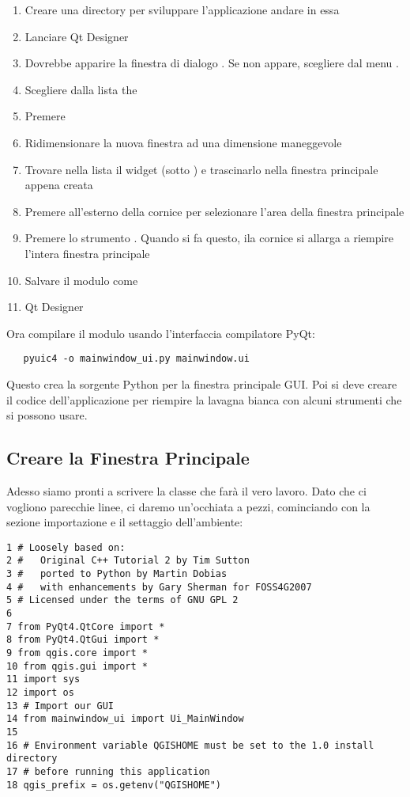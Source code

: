 \begin{enumerate}
\item Creare una directory per sviluppare l'applicazione andare in essa
\item Lanciare Qt Designer
\item Dovrebbe apparire la finestra di dialogo . Se non appare, scegliere
 dal menu .
\item Scegliere  dalla lista 
the  
\item Premere  
\item Ridimensionare la nuova finestra ad una dimensione maneggevole
\item Trovare nella lista il widget  
(sotto ) e trascinarlo nella finestra principale appena creata
\item Premere all'esterno della cornice per selezionare l'area della finestra principale 
\item Premere lo strumento . Quando si fa questo, ila cornice si allarga a riempire l'intera finestra principale
\item Salvare il modulo come  
\item {} Qt Designer
\end{enumerate} 

Ora compilare il modulo usando l'interfaccia compilatore PyQt:

\begin{verbatim}
   pyuic4 -o mainwindow_ui.py mainwindow.ui
\end{verbatim}

Questo crea la sorgente Python per la finestra principale GUI. Poi si deve creare il codice dell'applicazione per riempire la lavagna bianca con alcuni strumenti che si possono usare.

\subsection{Creare la Finestra Principale}

Adesso siamo pronti a scrivere la classe  che farà il vero lavoro.
Dato che ci vogliono parecchie linee, ci daremo un'occhiata a pezzi, cominciando con la sezione importazione e il settaggio dell'ambiente:

\begin{verbatim}
1 # Loosely based on:
2 #   Original C++ Tutorial 2 by Tim Sutton
3 #   ported to Python by Martin Dobias
4 #   with enhancements by Gary Sherman for FOSS4G2007
5 # Licensed under the terms of GNU GPL 2
6
7 from PyQt4.QtCore import *
8 from PyQt4.QtGui import *
9 from qgis.core import *
10 from qgis.gui import *
11 import sys
12 import os
13 # Import our GUI
14 from mainwindow_ui import Ui_MainWindow
15 
16 # Environment variable QGISHOME must be set to the 1.0 install directory
17 # before running this application
18 qgis_prefix = os.getenv("QGISHOME")
\end{verbatim}

